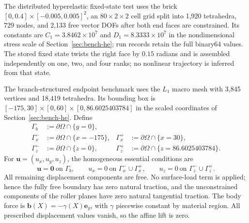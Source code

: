 The distributed hyperelastic fixed-state test uses the brick
$[0,0.4]\times[-0.005,0.005]^2$, an $80\times2\times2$ cell grid split into
1,920 tetrahedra, 729 nodes, and 2,133 free vector DOFs after both end faces are
constrained. Its constants are
$C_1=3.8462\times10^7$ and $D_1=8.3333\times10^7$ in the nondimensional stress
scale of Section~\ref{sec:bench-he}; run records retain the full binary64
values. The stored fixed state twists the right face by $0.15$ radians and is
assembled independently on one, two, and four ranks; no nonlinear trajectory is
inferred from that state.

The branch-structured endpoint benchmark uses the $L_1$ macro mesh with 3,845
vertices and 18,419 tetrahedra. Its bounding box is
$[-175,30]\times[0,60]\times[0,86.6025403784]$ in the scaled coordinates of
Section~\ref{sec:bench-he}. Define
\begin{equation}
  \begin{aligned}
    \Gamma_b&:=\partial\Omega\cap\{y=0\},\\
    \Gamma_x^-&:=\partial\Omega\cap\{x=-175\},&
    \Gamma_x^+&:=\partial\Omega\cap\{x=30\},\\
    \Gamma_z^-&:=\partial\Omega\cap\{z=0\},&
    \Gamma_z^+&:=\partial\Omega\cap\{z=86.6025403784\}.
  \end{aligned}
  \label{eq:endpoint-surrogate-boundaries}
\end{equation}
For $\boldsymbol{u}=(u_x,u_y,u_z)$, the homogeneous essential conditions are
\begin{equation}
  \boldsymbol{u}=\boldsymbol{0}\ \text{on }\Gamma_b,\qquad
  u_x=0\ \text{on }\Gamma_x^-\cup\Gamma_x^+,\qquad
  u_z=0\ \text{on }\Gamma_z^-\cup\Gamma_z^+.
  \label{eq:endpoint-surrogate-boundary-conditions}
\end{equation}
All remaining displacement components are free. No surface-load term is
applied; hence the fully free boundary has zero natural traction, and the
unconstrained components of the roller planes have zero natural tangential
traction. The body force is
$\boldsymbol{b}(X)=-\gamma(X)\boldsymbol{e}_y$, with $\gamma$ piecewise
constant by material region. All prescribed displacement values vanish, so
the affine lift is zero.

